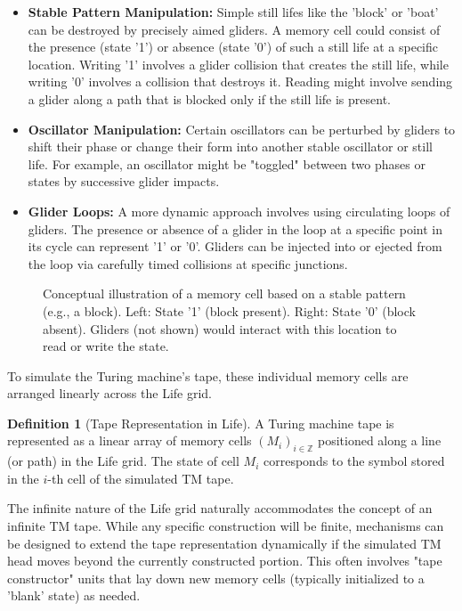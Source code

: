 \documentclass{article}
\theoremstyle{definition}
\newtheorem{definition}{Definition}[section]
\theoremstyle{plain}
\theoremstyle{plain}
\begin{document}
\begin{itemize}
  \item \textbf{Stable Pattern Manipulation:} Simple still lifes like the 'block' or 'boat' can be destroyed by precisely aimed gliders. A memory cell could consist of the presence (state '1') or absence (state '0') of such a still life at a specific location. Writing '1' involves a glider collision that creates the still life, while writing '0' involves a collision that destroys it. Reading might involve sending a glider along a path that is blocked only if the still life is present.
  \item \textbf{Oscillator Manipulation:} Certain oscillators can be perturbed by gliders to shift their phase or change their form into another stable oscillator or still life. For example, an oscillator might be "toggled" between two phases or states by successive glider impacts.
  \item \textbf{Glider Loops:} A more dynamic approach involves using circulating loops of gliders. The presence or absence of a glider in the loop at a specific point in its cycle can represent '1' or '0'. Gliders can be injected into or ejected from the loop via carefully timed collisions at specific junctions.
\end{itemize}

\begin{figure}[H]
  \centering
  \caption{Conceptual illustration of a memory cell based on a stable pattern (e.g., a block). Left: State '1' (block present). Right: State '0' (block absent). Gliders (not shown) would interact with this location to read or write the state.}
  \label{fig:memory-cell}
\end{figure}

To simulate the Turing machine's tape, these individual memory cells are arranged linearly across the Life grid.

\begin{definition}[Tape Representation in Life]
A Turing machine tape is represented as a linear array of memory cells $(M_i)_{i \in \mathbb{Z}}$ positioned along a line (or path) in the Life grid. The state of cell $M_i$ corresponds to the symbol stored in the $i$-th cell of the simulated TM tape.
\end{definition}

The infinite nature of the Life grid naturally accommodates the concept of an infinite TM tape. While any specific construction will be finite, mechanisms can be designed to extend the tape representation dynamically if the simulated TM head moves beyond the currently constructed portion. This often involves "tape constructor" units that lay down new memory cells (typically initialized to a 'blank' state) as needed.
\end{document}
